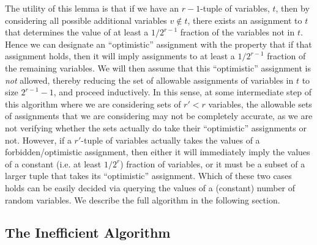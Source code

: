 \documentclass[final,12pt]{colt2018}
\begin{document}
The utility of this lemma is that if we have an $r-1$-tuple of variables, $t$, then by considering all possible additional variables $v \not \in t$, there exists an assignment to $t$ that determines the value of at least a $1/2^{r-1}$ fraction of the variables not in $t$.  Hence we can designate an ``optimistic'' assignment with the property that if that assignment holds, then it will imply assignments to at least a $1/2^{r-1}$ fraction of the remaining variables.   We will then assume that this ``optimistic'' assignment is \emph{not} allowed, thereby reducing the set of allowable assignments of variables in $t$ to size $2^{r-1}-1$, and proceed inductively.      In this sense, at some intermediate step of this algorithm where we are considering sets of $r' < r$ variables, the allowable sets of assignments that we are considering may not be completely accurate, as we are not verifying whether the sets actually do take their ``optimistic'' assignments or not.  However, if a $r'$-tuple of variables actually takes the values of a forbidden/optimistic assignment, then either it will immediately imply the values of a constant (i.e. at least $1/2^r$) fraction of variables, or it must be a subset of a larger tuple that takes its ``optimistic'' assignment.  Which of these two cases holds can be easily decided via querying the values of a (constant) number of random variables.  We describe the full algorithm in the following section.





\iffalse

promote the following, maybe just have it as an observation earlier??
We begin with three concrete examples that illustrate some basic properties of the model.

\begin{example}
Consider the setting where the underlying assignment to all $n$ variables is $T$, and each worker evaluates a set of $c$ variables.  If $\alpha \le 1/2^c$, then the remaining $(1-\alpha)$ fraction of the workers could return assignments in such a way that the distribution of assignments to each set of $c$ variables is uniform over the set of $2^c$ possible assignments, and hence the dataset will contain no information about the true assignments.  [SHOULD WE DESCRIBE THE MORE GENERAL SETTING where the reliable workers have some probability of errors?]
\end{example} 
\fi



\subsection{The Inefficient Algorithm}\label{sec:fullalg}
\end{document}
